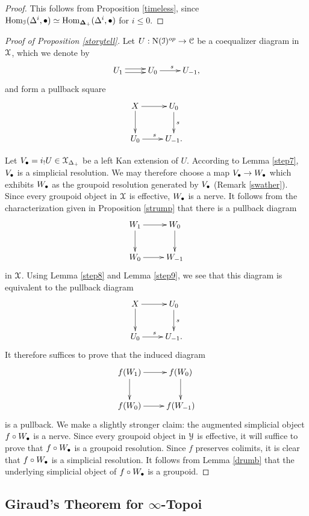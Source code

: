 \begin{proof}
This follows from Proposition \ref{timeless}, since $\operatorname{Hom}_{\operatorname{\mathcal{I}}}(\Delta^i, \bullet)
\simeq \operatorname{Hom}_{\operatorname{{\bf \Delta}}_{+}}( \Delta^i, \bullet )$ for $i \leq 0$.
\end{proof}

\begin{proof}[Proof of Proposition \ref{storytell}]
Let $U: \operatorname{N}(\operatorname{\mathcal{I}})^{op} \rightarrow \operatorname{\mathcal{C}}$ be a coequalizer diagram in $\operatorname{\mathcal{X}}$, which we denote by
$$ \xymatrix{ U_{1} \ar@<.5ex>[r] \ar@<-.5ex>[r] & U_0 \ar[r]^{s} & U_{-1}, } $$
and form a pullback square
$$ \xymatrix{ X \ar[r] \ar[d] & U_0 \ar[d]^{s} \\
U_0 \ar[r]^{s} & U_{-1}. }$$ 

Let $V_{\bullet} = i_{!} U \in \operatorname{\mathcal{X}}_{\Delta_{+}}$ be a left Kan extension of $U$. According to Lemma \ref{step7}, $V_{\bullet}$ is a simplicial resolution. We may therefore choose a map
$V_{\bullet} \rightarrow W_{\bullet}$ which exhibits $W_{\bullet}$ as the groupoid resolution generated by $V_{\bullet}$ (Remark \ref{swather}). Since every groupoid object in $\operatorname{\mathcal{X}}$ is effective, $W_{\bullet}$ is a \Cech nerve. It follows from the characterization given in Proposition \ref{strump} that there is a pullback diagram
$$ \xymatrix{ W_{1} \ar[r] \ar[d] & W_{0} \ar[d] \\
W_0 \ar[r] & W_{-1} }$$
in $\operatorname{\mathcal{X}}$. Using Lemma \ref{step8} and Lemma \ref{step9}, we see that this diagram is
equivalent to the pullback diagram $$ \xymatrix{ X \ar[r] \ar[d] & U_0 \ar[d]^{s} \\
U_0 \ar[r]^{s} & U_{-1}. }$$ It therefore suffices to prove that the induced diagram
$$ \xymatrix{ f(W_{1}) \ar[r] \ar[d] & f(W_{0}) \ar[d] \\
f(W_0) \ar[r] & f(W_{-1}) }$$
is a pullback. We make a slightly stronger claim: the augmented simplicial object
$f \circ W_{\bullet}$ is a \Cech nerve.
Since every groupoid object in $\operatorname{\mathcal{Y}}$ is effective, it will suffice to prove that $f \circ W_{\bullet}$ is a groupoid resolution. Since $f$ preserves colimits, it is clear that $f \circ W_{\bullet}$ is a simplicial resolution. It follows from Lemma \ref{drumb} that the underlying simplicial object of $f \circ W_{\bullet}$ is a groupoid.
\end{proof}

\subsection{Giraud's Theorem for $\infty$-Topoi}\label{proofgiraud}

